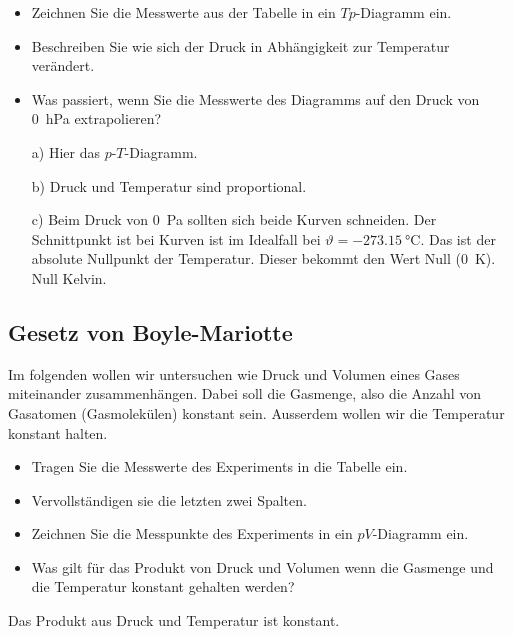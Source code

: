 \begin{aufgabe}
\begin{itemize}
\item Zeichnen Sie die Messwerte aus der Tabelle in ein $Tp$-Diagramm ein.
\item Beschreiben Sie wie sich der Druck in Abhängigkeit zur Temperatur verändert.
\item Was passiert, wenn Sie die Messwerte des Diagramms auf den Druck von \SI{0}{hPa} extrapolieren?
\end{itemize}
\begin{loesung}
	\begin{itemize}
		\item [a)] Hier das $p$-$T$-Diagramm.\par
	
\item [b)] Druck und Temperatur sind proportional.
\item [c)] Beim Druck von \SI{0}{Pa} sollten sich beide Kurven schneiden. Der Schnittpunkt ist bei Kurven ist im 
	Idealfall bei $\vartheta=\SI{-273.15}{\celsius}$. Das ist der absolute Nullpunkt der Temperatur. Dieser bekommt den Wert Null (\SI{0}{K}).
	Null Kelvin.
	\end{itemize}
\end{loesung}
\end{aufgabe}


\subsection{Gesetz von Boyle-Mariotte}
Im folgenden wollen wir untersuchen wie Druck und Volumen eines Gases miteinander zusammenhängen.
Dabei soll die Gasmenge, also die Anzahl von Gasatomen (Gasmolekülen) konstant sein.
Ausserdem wollen wir die Temperatur konstant halten.

\begin{aufgabe}
	\begin{itemize}
		\item Tragen Sie die Messwerte des Experiments in die Tabelle ein.
		\item Vervollständigen sie die letzten zwei Spalten. 
		\item Zeichnen Sie die Messpunkte des Experiments in ein $pV$-Diagramm ein.
		\item Was gilt für das Produkt von Druck und Volumen wenn die Gasmenge und die Temperatur konstant gehalten werden?
	\end{itemize}
	\begin{loesung}
		Das Produkt aus Druck und Temperatur ist konstant.
	\end{loesung}
\end{aufgabe}

